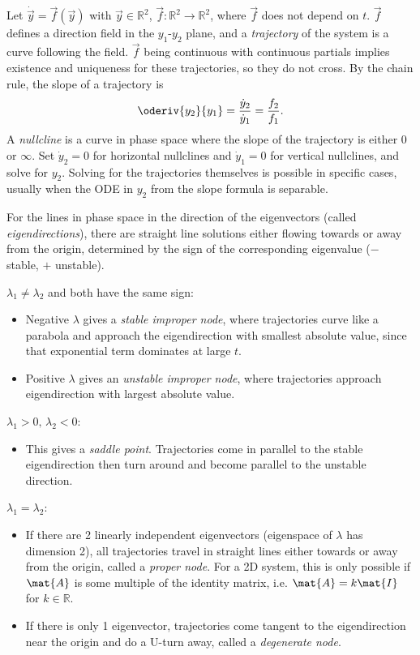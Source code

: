 \documentclass[10pt, a4paper]{article}
\begin{document}
\begin{landscape}
\begin{multicols}{2}
    Let \(\dot{\vec{y}} = \vec{f}(\vec{y})\) with \(\vec{y} \in \mathbb{R}^2\),
    \(\vec{f}: \mathbb{R}^2 \to \mathbb{R}^2\), where \(\vec{f}\) does not depend on \(t\).
    \(\vec{f}\) defines a direction field in
    the \(y_1\)-\(y_2\) plane, and a \emph{trajectory} of the system is a curve following the
    field. \(\vec{f}\) being continuous with continuous partials implies existence and uniqueness
    for these trajectories, so they do not cross. By the chain rule, the slope of a trajectory is
    \[\oderiv{y_2}{y_1} = \frac{\dot y_2}{\dot y_1} = \frac{f_2}{f_1}.\]
    A \emph{nullcline} is a curve in phase space where the slope of the trajectory is either 0 or \(\infty\).
    Set \(\dot y_2 = 0\) for horizontal nullclines and \(\dot y_1 = 0\) for vertical nullclines, and
    solve for \(y_2\). Solving for the trajectories themselves is possible in specific cases,
    usually when the ODE in \(y_2\) from the slope formula is separable.

    For the lines in phase space in the direction of the eigenvectors (called \emph{eigendirections}),
    there are straight line solutions either flowing towards or away from the origin, determined
    by the sign of the corresponding eigenvalue (\(-\) stable, \(+\) unstable).
    
    \(\lambda_1 \neq \lambda_2\) and both have the same sign:
    \begin{itemize}
        \item Negative \(\lambda\) gives a \emph{stable improper node}, where
            trajectories curve like a parabola and approach the eigendirection with smallest absolute value,
            since that exponential term dominates at large \(t\).
        \item Positive \(\lambda\) gives an
            \emph{unstable improper node}, where trajectories approach eigendirection with
            largest absolute value.
    \end{itemize}

    \(\lambda_1 > 0,\, \lambda_2 < 0\):
    \begin{itemize}
        \item This gives a \emph{saddle point}. Trajectories come in parallel to the
            stable eigendirection then turn around and become parallel to the unstable direction.
    \end{itemize}
    \vfill\columnbreak
    \(\lambda_1 = \lambda_2\):
    \begin{itemize}
        \item If there are 2 linearly independent eigenvectors (eigenspace of \(\lambda\) has dimension 2),
            all trajectories travel in straight lines either towards or away from the origin, called
            a \emph{proper node}. For a 2D system, this is only possible if \(\mat{A}\) is some multiple of
            the identity matrix, i.e. \(\mat{A} = k \mat{I}\) for \(k \in \mathbb{R}\).
        \item If there is only 1 eigenvector, trajectories come tangent to the eigendirection near the origin
            and do a U-turn away, called a \emph{degenerate node}.
    \end{itemize}


\end{multicols}
\end{landscape}
\end{document}

